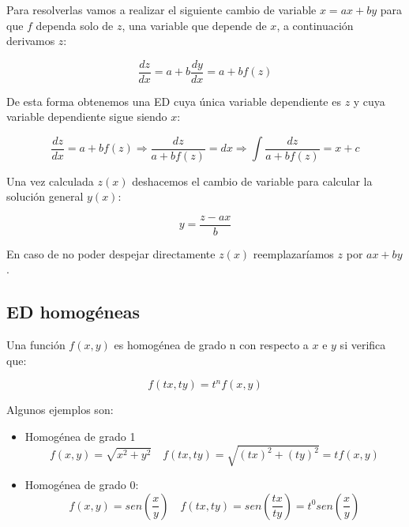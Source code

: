 \documentclass[a4paper,12pt,titlepage]{article}
\begin{document}
Para resolverlas vamos a realizar el siguiente cambio de variable $x=ax + by$ para que $f$ dependa solo de $z$, una variable que depende de $x$, a continuación derivamos $z$:

\begin{equation*}
    \frac{dz}{dx} = a + b\frac{dy}{dx} = a +bf(z)
\end{equation*}

De esta forma obtenemos una ED cuya única variable dependiente es $z$ y cuya variable dependiente sigue siendo $x$:

\begin{equation*}
    \frac{dz}{dx}= a +bf(z) \Rightarrow \frac{dz}{a+bf(z)} = dx \Rightarrow \int \frac{dz}{a+bf(z)} = x + c 
\end{equation*}

Una vez calculada $z(x)$ deshacemos el cambio de variable para calcular la solución general $y(x)$:

\begin{equation*}
    y = \frac{z-ax}{b}
\end{equation*}

En caso de no poder despejar directamente $z(x)$ reemplazaríamos $z$ por $ax+by$.

\subsection{ED homogéneas}

Una función $f(x,y)$ es homogénea de grado n con respecto a $x$ e $y$ si verifica que:

\begin{equation*}
    f(tx,ty) = t^n f(x,y)
\end{equation*}

Algunos ejemplos son:

\begin{itemize}
    \item Homogénea de grado 1
    \begin{equation*}
        f(x,y)= \sqrt{x^2+y^2} \quad f(tx,ty) = \sqrt{(tx)^2+(ty)^2} = t f(x,y)
    \end{equation*}
    \item Homogénea de grado 0:
    \begin{equation*}
        f(x,y) = sen \left (\frac{x}{y}\right ) \quad f(tx,ty) = sen \left (\frac{tx}{ty}\right ) = t^0 sen \left (\frac{x}{y}\right )
    \end{equation*}
\end{itemize}
\end{document}
